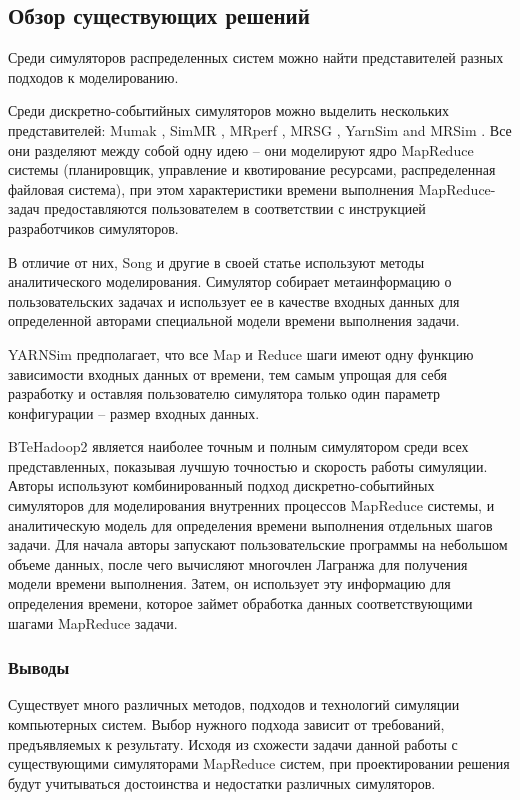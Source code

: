 \documentclass[../diploma.tex]{subfile}
\begin{document}
    
    \subsection{Обзор существующих решений}\label{sec:review:subsec:existing}

    Среди симуляторов распределенных систем можно найти представителей разных
    подходов к моделированию. 

    Среди дискретно-событийных симуляторов можно выделить нескольких
    представителей: Mumak \cite{mumak}, SimMR \cite{simmr}, MRperf
    \cite{mrperf}, MRSG \cite{mrsg}, YarnSim \cite{yarnsim} and MRSim
    \cite{mrsim}. Все они разделяют между собой одну идею -- они моделируют ядро
    MapReduce системы (планировщик, управление и квотирование ресурсами,
    распределенная файловая система), при этом характеристики времени выполнения
    MapReduce-задач предоставляются пользователем в соответствии с инструкцией
    разработчиков симуляторов. 

    В отличие от них, Song и другие в своей статье \cite{song} используют методы
    аналитического моделирования. Симулятор собирает метаинформацию о
    пользовательских задачах и использует ее в качестве входных данных для
    определенной авторами специальной модели времени выполнения задачи. 
    
    YARNSim предполагает, что все Map и Reduce шаги имеют одну функцию
    зависимости входных данных от времени, тем самым упрощая для себя разработку
    и оставляя пользователю симулятора только один параметр конфигурации --
    размер входных данных. 

    BTeHadoop2 \cite{baseline_model} является наиболее точным и полным
    симулятором среди всех представленных, показывая лучшую точностью и скорость
    работы симуляции. Авторы используют комбинированный подход
    дискретно-событийных симуляторов для моделирования внутренних процессов
    MapReduce системы, и аналитическую модель для определения времени выполнения
    отдельных шагов задачи. Для начала авторы запускают пользовательские
    программы на небольшом объеме данных, после чего вычисляют многочлен
    Лагранжа для получения модели времени выполнения. Затем, он использует эту
    информацию для определения времени, которое займет обработка данных
    соответствующими шагами MapReduce задачи.


    \subsubsection{Выводы}

    Существует много различных методов, подходов и технологий симуляции
    компьютерных систем. Выбор нужного подхода зависит от требований,
    предъявляемых к результату. Исходя из схожести задачи данной работы с
    существующими симуляторами MapReduce систем, при проектировании решения
    будут учитываться достоинства и недостатки различных симуляторов.
    
\end{document}

